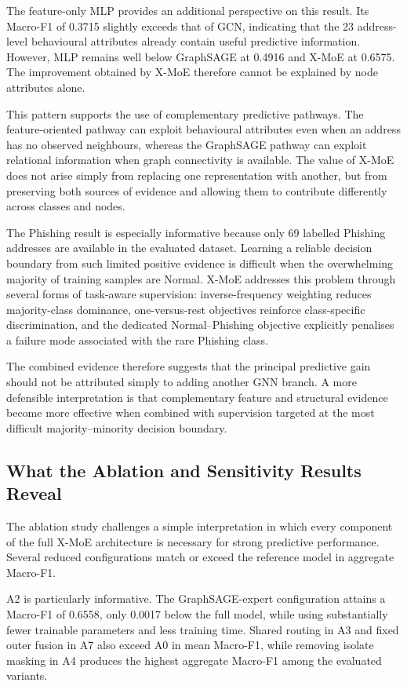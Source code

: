 \documentclass{ieeeaccess}
\begin{document}
The feature-only MLP provides an additional perspective on this result. Its Macro-F1 of 0.3715 slightly exceeds that of GCN, indicating that the 23 address-level behavioural attributes already contain useful predictive information. However, MLP remains well below GraphSAGE at 0.4916 and X-MoE at 0.6575. The improvement obtained by X-MoE therefore cannot be explained by node attributes alone.

This pattern supports the use of complementary predictive pathways. The feature-oriented pathway can exploit behavioural attributes even when an address has no observed neighbours, whereas the GraphSAGE pathway can exploit relational information when graph connectivity is available. The value of X-MoE does not arise simply from replacing one representation with another, but from preserving both sources of evidence and allowing them to contribute differently across classes and nodes.

The Phishing result is especially informative because only 69 labelled Phishing addresses are available in the evaluated dataset. Learning a reliable decision boundary from such limited positive evidence is difficult when the overwhelming majority of training samples are Normal. X-MoE addresses this problem through several forms of task-aware supervision: inverse-frequency weighting reduces majority-class dominance, one-versus-rest objectives reinforce class-specific discrimination, and the dedicated Normal--Phishing objective explicitly penalises a failure mode associated with the rare Phishing class.

The combined evidence therefore suggests that the principal predictive gain should not be attributed simply to adding another GNN branch. A more defensible interpretation is that complementary feature and structural evidence become more effective when combined with supervision targeted at the most difficult majority--minority decision boundary.


\subsection{What the Ablation and Sensitivity Results Reveal}

The ablation study challenges a simple interpretation in which every component of the full X-MoE architecture is necessary for strong predictive performance. Several reduced configurations match or exceed the reference model in aggregate Macro-F1.

A2 is particularly informative. The GraphSAGE-expert configuration attains a Macro-F1 of 0.6558, only 0.0017 below the full model, while using substantially fewer trainable parameters and less training time. Shared routing in A3 and fixed outer fusion in A7 also exceed A0 in mean Macro-F1, while removing isolate masking in A4 produces the highest aggregate Macro-F1 among the evaluated variants.
\end{document}

